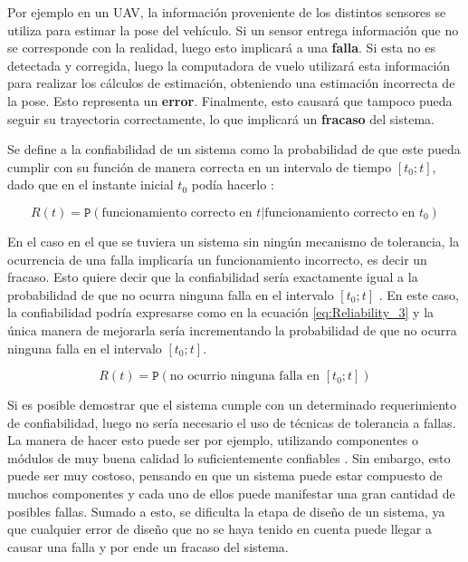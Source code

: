Por ejemplo en un UAV, la información proveniente de los distintos sensores se utiliza para estimar la pose del vehículo. Si un sensor entrega información que no se corresponde con la realidad, luego esto implicará a una \textbf{falla}. Si esta no es detectada y corregida, luego la computadora de vuelo utilizará esta información para realizar los cálculos de estimación, obteniendo una estimación incorrecta de la pose. Esto representa un \textbf{error}. Finalmente, esto causará que tampoco pueda seguir su trayectoria correctamente, lo que implicará un \textbf{fracaso} del sistema.

Se define a la confiabilidad de un sistema como la probabilidad de que este pueda cumplir con su función de manera correcta en un intervalo de tiempo $[t_0;t]$, dado que en el instante inicial $t_0$ podía hacerlo \cite[p.~10]{kopetz-2011}:

\begin{equation}
    R(t) = \mathtt{P}\left( \text{funcionamiento correcto en $t$} | \text{funcionamiento correcto en $t_0$} \right)
    \label{eq:Reliability}
\end{equation}

En el caso en el que se tuviera un sistema sin ningún mecanismo de tolerancia, la ocurrencia de una falla implicaría un funcionamiento incorrecto, es decir un fracaso. Esto quiere decir que la confiabilidad sería exactamente igual a la probabilidad de que no ocurra ninguna falla en el intervalo $[t_0;t]$ \cite{nelson1990fault}. En este caso, la confiabilidad podría expresarse como en la ecuación \eqref{eq:Reliability_3} y la única manera de mejorarla sería incrementando la probabilidad de que no ocurra ninguna falla en el intervalo $[t_0;t]$.

\begin{equation}
    R(t) = \mathtt{P}\left( \text{no ocurrio ninguna falla en $[t_0;t]$} \right)
    \label{eq:Reliability_3}
\end{equation}

Si es posible demostrar que el sistema cumple con un determinado requerimiento de confiabilidad, luego no sería necesario el uso de técnicas de tolerancia a fallas. La manera de hacer esto puede ser por ejemplo, utilizando componentes o módulos de muy buena calidad lo suficientemente confiables \cite{nelson1990fault}. Sin embargo, esto puede ser muy costoso, pensando en que un sistema puede estar compuesto de muchos componentes y cada uno de ellos puede manifestar una gran cantidad de posibles fallas. Sumado a esto, se dificulta la etapa de diseño de un sistema, ya que cualquier error de diseño que no se haya tenido en cuenta puede llegar a causar una falla y por ende un fracaso del sistema.

